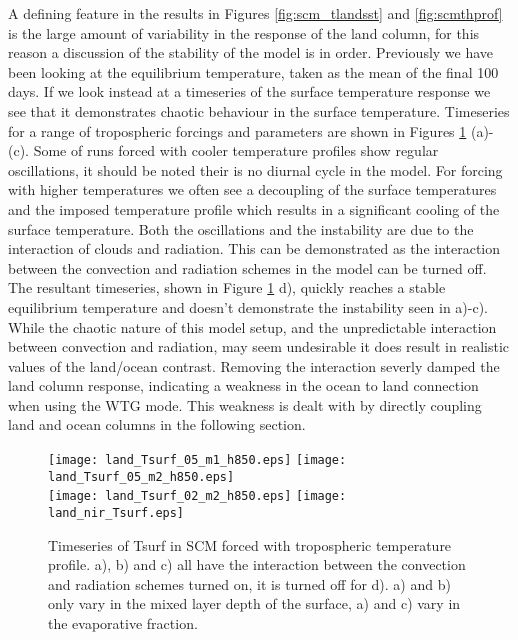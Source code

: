 A defining feature in the results in Figures \ref{fig:scm_tlandsst} and 
\ref{fig:scmthprof} is the large amount of variability in the response of the 
land column, for this reason a discussion of the stability of the model is in 
order. Previously we have been looking at the equilibrium temperature, taken as 
the mean of the final 100 days. If we look instead at a timeseries of the 
surface temperature response we see that it demonstrates chaotic behaviour in 
the surface temperature. Timeseries for a range of tropospheric forcings and 
parameters are shown in Figures \ref{fig:scmts} (a)-(c). Some of runs forced 
with cooler temperature profiles show regular oscillations, it should be noted 
their is no diurnal cycle in the model.  For forcing with higher temperatures we 
often see a decoupling of the surface temperatures and the imposed temperature 
profile which results in a significant cooling of the surface temperature.  Both 
the oscillations and the instability are due to the interaction of clouds and 
radiation. This can be demonstrated as the interaction between the convection 
and radiation schemes in the model can be turned off. The resultant timeseries, 
shown in Figure \ref{fig:scmts} d), quickly reaches a stable equilibrium 
temperature and doesn't demonstrate the instability seen in a)-c). While the 
chaotic nature of this model setup, and the unpredictable interaction between 
convection and radiation, may seem undesirable it does result in realistic 
values of the land/ocean contrast. Removing the interaction severly damped the 
land column response, indicating a weakness in the ocean to land connection when 
using the WTG mode. This weakness is dealt with by directly coupling land and 
ocean columns in the following section.

\begin{figure}[ht]
\texttt{[image: land\_Tsurf\_05\_m1\_h850.eps]}
\texttt{[image: land\_Tsurf\_05\_m2\_h850.eps]}\\
\texttt{[image: land\_Tsurf\_02\_m2\_h850.eps]}
\texttt{[image: land\_nir\_Tsurf.eps]}\\
\caption{Timeseries of Tsurf in SCM forced with tropospheric temperature 
profile. a), b) and c) all have the interaction between the convection and 
radiation schemes turned on, it is turned off for d). a) and b) only vary in the 
mixed layer depth of the surface, a) and c) vary in the evaporative fraction.}
\label{fig:scmts}
\end{figure}

